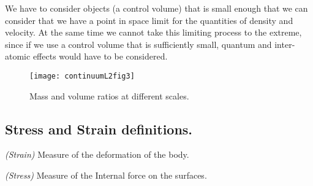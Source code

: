 We have to consider objects (a control volume) that is small enough that we can consider that we have a point in space limit for the quantities of density and velocity.  At the same time we cannot take this limiting process to the extreme, since if we use a control volume that is sufficiently small, quantum and inter-atomic effects would have to be considered.

\begin{figure}[htp]
   \centering
   \texttt{[image: continuumL2fig3]}
   \caption{Mass and volume ratios at different scales.}\label{fig:continuumL2:continuumL2fig3}
\end{figure}

\subsection{Stress and Strain definitions.}

\begin{definition}
\emph{(Strain)}
\label{dfn:continuumL2:30}
Measure of the deformation of the body.
\end{definition}

\begin{definition}
\emph{(Stress)}
\label{dfn:continuumL2:10}
Measure of the Internal force on the surfaces.
\end{definition}

